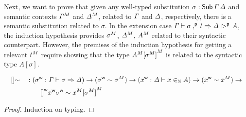 Next, we want to prove that given any well-typed substitution $\sigma
: \mathsf{Sub}\,\mathit{\Gamma}\,\mathit{\Delta}$ and semantic contexts ${\mathit{\Gamma}}^M$ and
${\mathit{\Delta}}^M$, related to $\mathit{\Gamma}$ and $\mathit{\Delta}$, respectively, there is a
semantic substitution related to $\sigma$.  In the extension case
$\mathit{\Gamma}\vdash \sigma \mathbin{{,}^{\mathsf{p}}}\,t\Rightarrow \mathit{\Delta}\,\mathbin{{\rhd}^{\mathsf{p}}}\,A$, the induction
hypothesis provides ${\sigma}^M$, ${\mathit{\Delta}}^M$, ${A}^M$ related to
their syntactic counterpart. However, the premises of the induction hypothesis
for getting a relevant ${t}^M$ require showing that the type
${A}^M{[{\sigma}^M]}^M$ is related to the syntactic type
$A[\sigma]$.
\begin{lemma}
\begin{alignat*}{5}
  & []{\sim} && :
  ({\sigma}^{\mathsf{w}} : \mathit{\Gamma} \vdash \sigma \Rightarrow \mathit{\Delta}) \rightarrow
  ({\sigma}^{\mathsf{w}} \sim {\sigma}^M) \rightarrow
  ({x}^{\mathsf{w}} : \mathit{\Delta} \vdash x \in_{\mathbb{N}} A) \rightarrow
  ({x}^{\mathsf{w}} \sim {x}^M) \rightarrow
  \\ & && \qquad
   {[]}^{\mathsf{w}}{x}^{\mathsf{w}}{\sigma}^{\mathsf{w}} \sim {x}^M{[{\sigma}^M]}^M
\end{alignat*}
\end{lemma}
\begin{proof}
  Induction on typing.
\end{proof}

